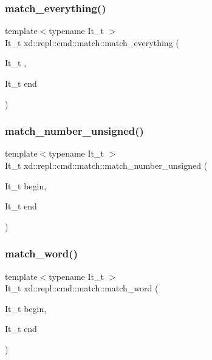 \subsubsection{\texorpdfstring{match\+\_\+everything()}{match\_everything()}}
{\footnotesize\ttfamily template$<$typename It\+\_\+t $>$ \\
It\+\_\+t xd\+::repl\+::cmd\+::match\+::match\+\_\+everything (\begin{DoxyParamCaption}\item[{It\+\_\+t}]{,  }\item[{It\+\_\+t}]{end }\end{DoxyParamCaption})}

\mbox{\label{namespacexd_1_1repl_1_1cmd_1_1match_a538583c38508105d0ff00a17db2c9223}} 
\subsubsection{\texorpdfstring{match\+\_\+number\+\_\+unsigned()}{match\_number\_unsigned()}}
{\footnotesize\ttfamily template$<$typename It\+\_\+t $>$ \\
It\+\_\+t xd\+::repl\+::cmd\+::match\+::match\+\_\+number\+\_\+unsigned (\begin{DoxyParamCaption}\item[{It\+\_\+t}]{begin,  }\item[{It\+\_\+t}]{end }\end{DoxyParamCaption})}

\mbox{\label{namespacexd_1_1repl_1_1cmd_1_1match_a6d03db8267a2bd0ac79c7d159cb5ad48}} 
\subsubsection{\texorpdfstring{match\+\_\+word()}{match\_word()}}
{\footnotesize\ttfamily template$<$typename It\+\_\+t $>$ \\
It\+\_\+t xd\+::repl\+::cmd\+::match\+::match\+\_\+word (\begin{DoxyParamCaption}\item[{It\+\_\+t}]{begin,  }\item[{It\+\_\+t}]{end }\end{DoxyParamCaption})}

